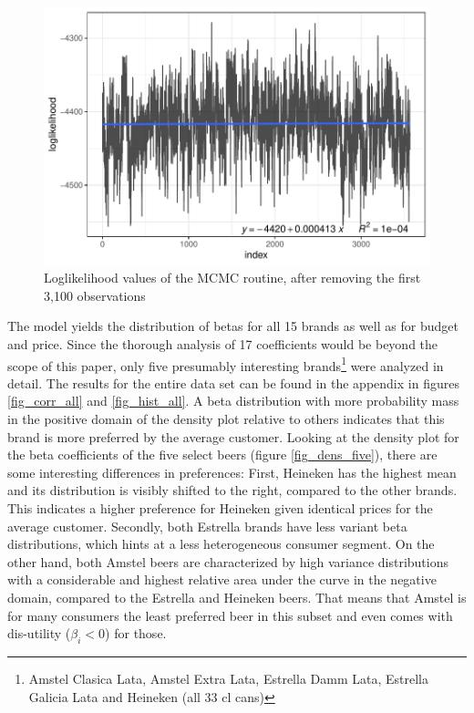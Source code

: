 \documentclass[12pt,a4paper]{article}
\begin{document}
\begin{figure}[ht]
	\centering
  \includegraphics[scale = 0.7]{figures/mcmc_after_burnin_fitted.pdf}
	\caption{Loglikelihood values of the MCMC routine, after removing the first 3,100 observations}
	\label{fig_mcmc_burnin}
\end{figure}

The model yields the distribution of betas for all 15 brands as well as for budget and price.
Since the thorough analysis of 17 coefficients would be beyond the scope of this paper, only five presumably interesting brands\footnote{Amstel Clasica Lata, Amstel Extra Lata, Estrella Damm Lata, Estrella Galicia Lata and Heineken (all 33 cl cans)} were analyzed in detail.
The results for the entire data set can be found in the appendix in figures \ref{fig_corr_all} and \ref{fig_hist_all}.
A beta distribution with more probability mass in the positive domain of the density plot relative to others indicates that this brand is more preferred by the average customer.
Looking at the density plot for the beta coefficients of the five select beers (figure \ref{fig_dens_five}), there are some interesting differences in preferences:
First, Heineken has the highest mean and its distribution is visibly shifted to the right, compared to the other brands.
This indicates a higher preference for Heineken given identical prices for the average customer.
Secondly, both Estrella brands have less variant beta distributions, which hints at a less heterogeneous consumer segment.
On the other hand, both Amstel beers are characterized by high variance distributions with a considerable and highest relative area under the curve in the negative domain, compared to the Estrella and Heineken beers.
That means that Amstel is for many consumers the least preferred beer in this subset and even comes with dis-utility ($\beta_{i}<0$) for those.
\end{document}
